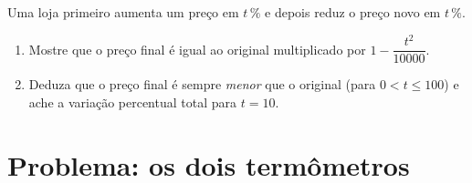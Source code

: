 \begin{exercise}[$\star\star\star$]\label{exo:g9:linfunc:10}
Uma loja primeiro aumenta um preço em $t\,\%$ e depois reduz o preço
novo em $t\,\%$.
\begin{enumerate}
  \item Mostre que o preço final é igual ao original multiplicado por
        $1 - \dfrac{t^2}{10000}$.
  \item Deduza que o preço final é sempre \emph{menor} que o original
        (para $0 < t \leq 100$) e ache a variação percentual total para
        $t = 10$.
\end{enumerate}
\end{exercise}

\section{Problema: os dois termômetros}

